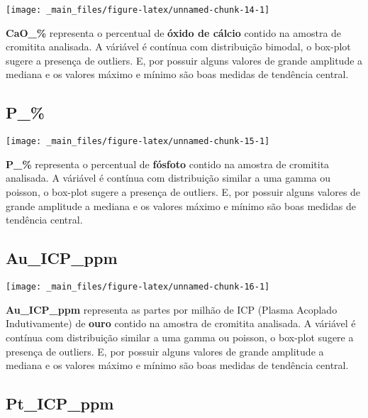 \documentclass[
]{article}
\begin{document}
\begin{center}\texttt{[image: \_main\_files/figure-latex/unnamed-chunk-14-1]} \end{center}

\textbf{CaO\_\%} representa o percentual de \textbf{óxido de cálcio} contido na amostra de cromitita analisada. A váriável é contínua com distribuição bimodal, o box-plot sugere a presença de outliers. E, por possuir alguns valores de grande amplitude a mediana e os valores máximo e mínimo são boas medidas de tendência central.

\hypertarget{p_}{%
\subsection{P\_\%}\label{p_}}

\begin{center}\texttt{[image: \_main\_files/figure-latex/unnamed-chunk-15-1]} \end{center}

\textbf{P\_\%} representa o percentual de \textbf{fósfoto} contido na amostra de cromitita analisada. A váriável é contínua com distribuição similar a uma gamma ou poisson, o box-plot sugere a presença de outliers. E, por possuir alguns valores de grande amplitude a mediana e os valores máximo e mínimo são boas medidas de tendência central.

\hypertarget{au_icp_ppm}{%
\subsection{Au\_ICP\_ppm}\label{au_icp_ppm}}

\begin{center}\texttt{[image: \_main\_files/figure-latex/unnamed-chunk-16-1]} \end{center}

\textbf{Au\_ICP\_ppm} representa as partes por milhão de ICP (Plasma Acoplado Indutivamente) de \textbf{ouro} contido na amostra de cromitita analisada. A váriável é contínua com distribuição similar a uma gamma ou poisson, o box-plot sugere a presença de outliers. E, por possuir alguns valores de grande amplitude a mediana e os valores máximo e mínimo são boas medidas de tendência central.

\hypertarget{pt_icp_ppm}{%
\subsection{Pt\_ICP\_ppm}\label{pt_icp_ppm}}
\end{document}
